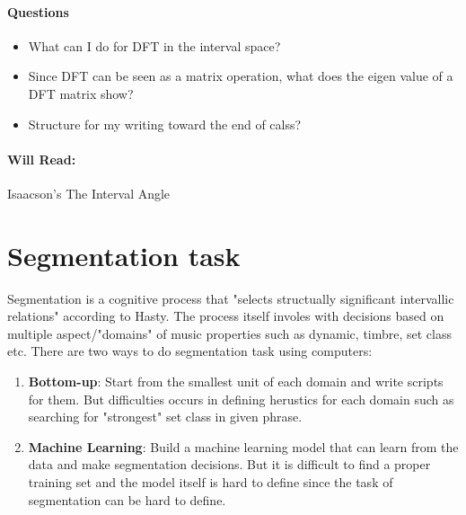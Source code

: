 \documentclass[12pt]{report}
\begin{document}
\paragraph*{Questions}
\begin{itemize}
    \item What can I do for DFT in the interval space?
    \item Since DFT can be seen as a matrix operation, what does the eigen value of a DFT matrix show?
    \item Structure for my writing toward the end of calss?
\end{itemize}
\paragraph*{Will Read:}
Isaacson's The Interval Angle
\section*{Segmentation task}
Segmentation is a cognitive process that "selects structually significant 
intervallic relations" according to Hasty. The process itself involes with 
decisions based on multiple aspect/"domains" of music properties such as
dynamic, timbre, set class etc. There are two ways to do segmentation task using 
computers:
\begin{enumerate}
    \item \textbf{Bottom-up}: Start from the smallest unit of each domain and write 
    scripts for them. But difficulties occurs in defining herustics for each domain such 
    as searching for "strongest" set class in given phrase.
    \item \textbf{Machine Learning}: Build a machine learning model 
    that can learn from the data and make segmentation decisions. But it is
    difficult to find a proper training set and the model itself is hard to
    define since the task of segmentation can be hard to define.
\end{enumerate}
\end{document}
